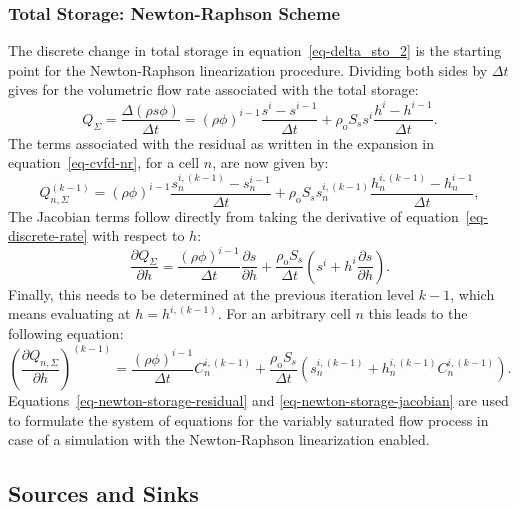 \documentclass[fleqn]{article}
\begin{document}
\subsubsection*{Total Storage: Newton-Raphson Scheme}
The discrete change in total storage in equation~\ref{eq-delta_sto_2}
is the starting point for the Newton-Raphson linearization procedure. 
Dividing both sides by $\Delta t$ gives for the volumetric flow
rate associated with the total storage:
\begin{equation}
  Q_\Sigma = \frac{\Delta (\rho s \phi)}{\Delta t} = 
    (\rho \phi)^{i-1}\frac{s^i - s^{i-1}}{\Delta t} +
    \rho_{\textrm{o}} S_s s^i \frac{h^i - h^{i-1}}{\Delta t}.
    \label{eq-discrete-rate}
\end{equation}
The terms associated with the residual as written in the expansion
in equation~\ref{eq-cvfd-nr}, for a cell $n$, are now given by:
\begin{equation}
  Q_{n,\Sigma}^{(k-1)} =
  (\rho \phi)^{i-1}\frac{s_n^{i,(k-1)} - s_n^{i-1}}{\Delta t} +
  \rho_{\textrm{o}} S_s s_n^{i,(k-1)}
  \frac{h_n^{i,(k-1)} - h_n^{i-1}}{\Delta t},
  \label{eq-newton-storage-residual}
\end{equation}
The Jacobian terms follow directly from taking the derivative
of equation~\ref{eq-discrete-rate} with respect to $h$:
\begin{equation}
  \frac{\partial Q_{\Sigma}}{\partial h} =
  \frac{(\rho\phi)^{i-1}}{\Delta t} 
  \frac{\partial s}{\partial h} +
  \frac{\rho_{\textrm{o}} S_s}{\Delta t}
  \left( s^i + h^i \frac{\partial s}{\partial h} \right).
\end{equation}
Finally, this needs to be determined at the previous iteration level
$k-1$, which means evaluating at $h = h^{i,(k-1)}$. For an arbitrary 
cell $n$ this leads to the following equation:
\begin{equation}
  \left( \frac{\partial Q_{n,\Sigma}}{\partial h} \right)^{(k-1)} =
  \frac{(\rho\phi)^{i-1}}{\Delta t} C_n^{i,(k-1)} +
  \frac{\rho_{\textrm{o}} S_s}{\Delta t}
  \left( 
    s_n^{i,(k-1)} + h_n^{i,(k-1)} C_n^{i,(k-1)}
  \right).
  \label{eq-newton-storage-jacobian}
\end{equation}
Equations~\ref{eq-newton-storage-residual} and
\ref{eq-newton-storage-jacobian} are used to formulate the system of
equations for the variably saturated flow process in case of
a simulation with the Newton-Raphson linearization enabled.

\subsection{Sources and Sinks}
\end{document}

